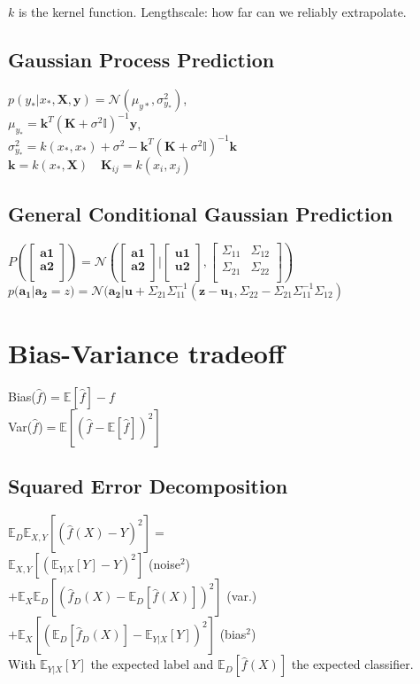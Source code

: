 $k$ is the kernel function. Lengthscale: how far can we reliably extrapolate.
\subsection*{Gaussian Process Prediction}
$p(y_*|x_*,\mathbf{X},\mathbf{y}) = \mathcal{N}(\mu_{y*},\sigma^2_{y_*})$,\\
$\mu_{y_*}=\mathbf{k}^T(\mathbf{K}+\sigma^2\mathbb{I})^{-1}\mathbf{y}$,\\
$\sigma^2_{y_*}=k(x_*,x_*){+}\sigma^2-\mathbf{k}^T(\mathbf{K}+\sigma^2\mathbb{I})^{-1}\mathbf{k}$\\
$\mathbf{k}=k(x_*,\mathbf{X})\quad \mathbf{K}_{ij}=k(x_i,x_j)$

\subsection*{General Conditional Gaussian Prediction}
$P(\begin{bmatrix}
\mathbf{a1}\\
\mathbf{a2}\\
\end{bmatrix}){=}\mathcal{N}(\begin{bmatrix}
\mathbf{a1}\\
\mathbf{a2}\\
\end{bmatrix}|\begin{bmatrix}
\mathbf{u1}\\
\mathbf{u2}\\
\end{bmatrix},\begin{bmatrix}
\Sigma_{11} & \Sigma_{12} \\
\Sigma_{21} & \Sigma_{22}\\
\end{bmatrix})$\\
 $p(\mathbf{a_1}|\mathbf{a_2} = z) =  \mathcal{N}(\mathbf{a_2}|\mathbf{u}+\Sigma_{21} \Sigma_{11}^{-1}(\mathbf{z}-\mathbf{u_1}, \Sigma_{22}- \Sigma_{21} \Sigma_{11}^{-1} \Sigma_{12})$


\section*{Bias-Variance tradeoff}
Bias($\hat{f}$)$=\mathbb{E}[\hat{f}]-f$\\
Var($\hat{f}$)$=\mathbb{E}[(\hat{f}-\mathbb{E}[\hat{f}])^2]$
\subsection*{Squared Error Decomposition}
$\mathbb{E}_D\mathbb{E}_{X,Y}[(\hat{f}(X)-Y)^2]=$\\
$\mathbb{E}_{X,Y}[(\mathbb{E}_{Y|X}[Y]-Y)^2]$ (noise$^2$)\\
$+\mathbb{E}_X\mathbb{E}_D[(\hat{f}_D(X)-\mathbb{E}_D[\hat{f}(X)])^2]$ (var.)\\
$+\mathbb{E}_X[(\mathbb{E}_D[\hat{f}_D(X)]-\mathbb{E}_{Y|X}[Y])^2]$ (bias$^2$)\\
With $\mathbb{E}_{Y|X}[Y]$ the expected label and $\mathbb{E}_{D}[\hat{f}(X)]$ the expected classifier.